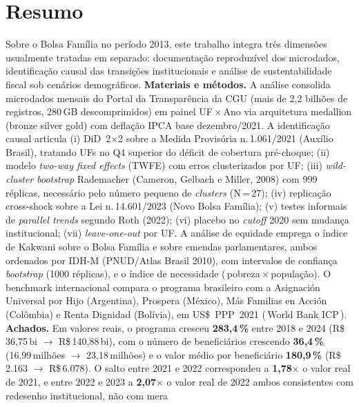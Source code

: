 \documentclass[12pt,a4paper,oneside]{article}
\newcommand{\rs}{R\$\,}
\begin{document}
\section*{Resumo}
\begin{singlespace}\small\noindent
Sobre o Bolsa Família no período 2013, este trabalho
integra três dimensões usualmente tratadas em separado: documentação
reproduzível dos microdados, identificação causal das transições
institucionais e análise de sustentabilidade fiscal sob cenários
demográficos. \textbf{Materiais e métodos.}
A análise consolida microdados mensais do Portal da Transparência
da CGU (mais de 2,2 bilhões de registros, 280\,GB descomprimidos)
em painel UF\,$\times$\,Ano via arquitetura
medallion (bronze \textrightarrow{} silver \textrightarrow{} gold) com
deflação IPCA base dezembro/2021. A identificação causal articula
(i) DiD~2$\times$2 sobre a Medida Provisória n.\,1.061/2021 (Auxílio
Brasil), tratando UFs no Q4 superior do déficit de cobertura
pré-choque; (ii) modelo \textit{two-way fixed effects} (TWFE) com
erros clusterizados por UF; (iii) \textit{wild-cluster bootstrap}
Rademacher (Cameron, Gelbach e Miller, 2008) com 999 réplicas,
necessário pelo número pequeno de \textit{clusters} (N\,=\,27);
(iv) replicação cross-shock sobre a Lei n.\,14.601/2023 (Novo Bolsa
Família); (v) testes informais de \textit{parallel trends} segundo
Roth (2022); (vi) placebo no \textit{cutoff} 2020 sem mudança
institucional; (vii) \textit{leave-one-out} por UF. A análise de
equidade emprega o índice de Kakwani sobre o Bolsa Família e sobre
emendas parlamentares, ambos ordenados por IDH-M (PNUD/Atlas Brasil
2010), com intervalos de confiança \textit{bootstrap} (1000
réplicas), e o índice de necessidade (\,pobreza\,$\times$\,população).
O benchmark internacional compara o programa brasileiro com a
Asignación Universal por Hijo (Argentina), Prospera (México), Más
Familias en Acción (Colômbia) e Renta Dignidad (Bolívia), em
US\$~PPP~2021 (\,World Bank ICP\,). \textbf{Achados.} Em valores
reais, o programa cresceu \textbf{283,4\,\%} entre 2018 e 2024
(\rs 36,75\,bi $\rightarrow$ \rs 140,88\,bi), com o número de
beneficiários crescendo \textbf{36,4\,\%} (16,99\,milhões $\rightarrow$
23,18\,milhões) e o valor médio por beneficiário \textbf{180,9\,\%}
(\rs 2.163 $\rightarrow$ \rs 6.078). O salto entre 2021 e 2022
correspondeu a \textbf{1,78$\times$} o valor real de 2021, e entre
2022 e 2023 a \textbf{2,07$\times$} o valor real de 2022 \textemdash{}
ambos consistentes com redesenho institucional, não com mera

\end{singlespace}
\end{document}
